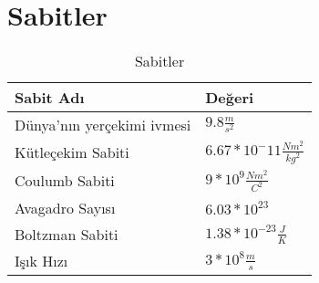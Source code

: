 \chapter{Sabitler}
\pagestyle{fancy}
\fancyhf{}
\lhead{\thepage}
\begin{table}[h!]
    \centering
    \caption{Sabitler}
    \vspace*{0.5cm}
    \begin{tabular}{| m{6cm} | m{6cm} |}
        \hline
        Sabit Adı & Değeri \\ \hline \hline
        Dünya'nın yerçekimi ivmesi & $9.8 \frac{m}{s^2}$ \\ \hline
        Kütleçekim Sabiti & $6.67 * 10^-11 \frac{N m^2}{kg^2}$ \\ \hline
        Coulumb Sabiti & $9* 10^9 \frac{N m^2}{C^2}$ \\ \hline
        Avagadro Sayısı & $6.03*10^{23}$ \\ \hline
        Boltzman Sabiti & $1.38*10^{-23} \frac{J}{K}$ \\ \hline
        Işık Hızı & $3*10^8 \frac{m}{s}$ \\ \hline
    \end{tabular}
\end{table}